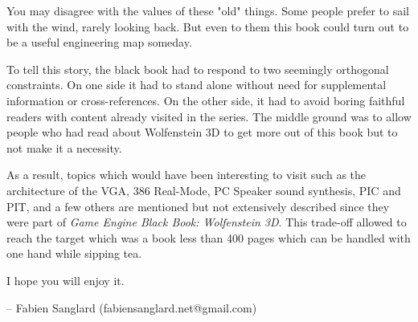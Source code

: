 You may disagree with the values of these "old" things. Some people prefer to sail with the wind, rarely looking back. But even to them this book could turn out to be a useful engineering map someday.\\
\par
 To tell this story, the black book had to respond to two seemingly orthogonal constraints. On one side it had to stand alone without need for supplemental information or cross-references. On the other side, it had to avoid boring faithful readers with content already visited in the series. The middle ground was to allow people who had read about Wolfenstein 3D to get more out of this book but to not make it a necessity.\\
 \par
  As a result, topics which would have been interesting to visit such as the architecture of the VGA, 386 Real-Mode, PC Speaker sound synthesis, PIC and PIT, and a few others are mentioned but not extensively described since they were part of \textit{Game Engine Black Book: Wolfenstein 3D}. This trade-off allowed to reach the target which was a book less than 400 pages which can be handled with one hand while sipping tea.\\
\par
I hope you will enjoy it.\\
\par
-- Fabien Sanglard (fabiensanglard.net@gmail.com)
